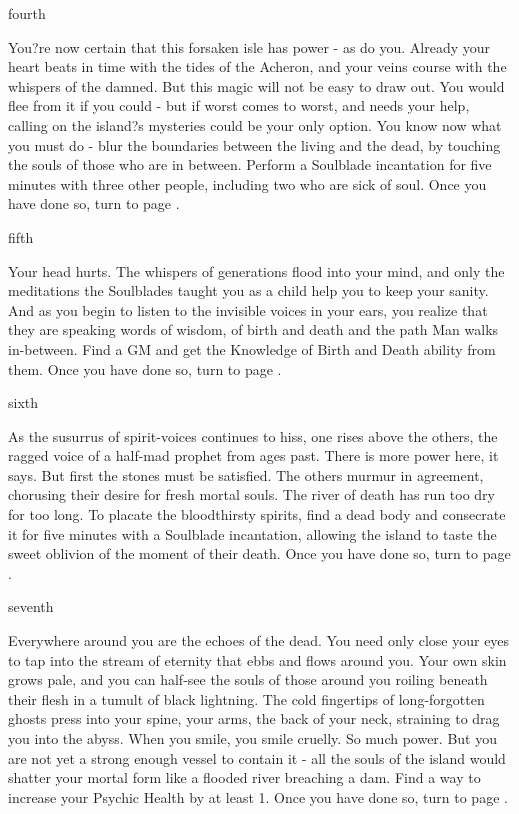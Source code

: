 \documentclass[greennotebook]{Kos}
\begin{document}
\begin{page}{fourth}

You?re now certain that this forsaken isle has power - as do you. Already your heart beats in time with the tides of the Acheron, and your veins course with the whispers of the damned. But this magic will not be easy to draw out. You would flee from it if you could - but if worst comes to worst, and \cBride{\nickname} needs your help, calling on the island?s mysteries could be your only option. You know now what you must do - blur the boundaries between the living and the dead, by touching the souls of those who are in between. Perform a Soulblade incantation for five minutes with three other people, including two who are sick of soul. Once you have done so, turn to page .

\end{page}

\begin{page}{fifth}

Your head hurts. The whispers of generations flood into your mind, and only the meditations the Soulblades taught you as a child help you to keep your sanity. And as you begin to listen to the invisible voices in your ears, you realize that they are speaking words of wisdom, of birth and death and the path Man walks in-between. Find a GM and get the Knowledge of Birth and Death ability from them. Once you have done so, turn to page .

\end{page}
\begin{page}{sixth}

As the susurrus of spirit-voices continues to hiss, one rises above the others, the ragged voice of a half-mad prophet from ages past. There is more power here, it says. But first the stones must be satisfied. The others murmur in agreement, chorusing their desire for fresh mortal souls. The river of death has run too dry for too long. To placate the bloodthirsty spirits, find a dead body and consecrate it for five minutes with a Soulblade incantation, allowing the island to taste the sweet oblivion of the moment of their death. Once you have done so, turn to page .

\end{page}

\begin{page}{seventh}

Everywhere around you are the echoes of the dead. You need only close your eyes to tap into the stream of eternity that ebbs and flows around you. Your own skin grows pale, and you can half-see the souls of those around you roiling beneath their flesh in a tumult of black lightning. The cold fingertips of long-forgotten ghosts press into your spine, your arms, the back of your neck, straining to drag you into the abyss. When you smile, you smile cruelly. So much power. But you are not yet a strong enough vessel to contain it - all the souls of the island would shatter your mortal form like a flooded river breaching a dam. Find a way to increase your Psychic Health by at least 1. Once you have done so, turn to page .

\end{page}
\end{document}
